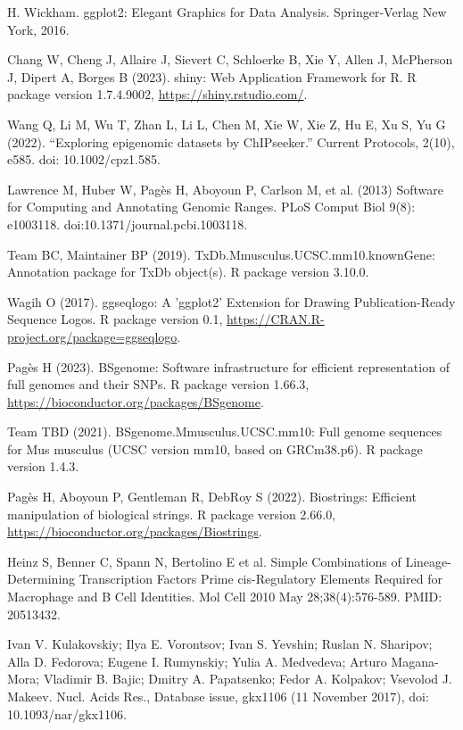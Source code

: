 \documentclass[12pt]{article}
\begin{document}
\begin{thebibliography}{99}
 H. Wickham. ggplot2: Elegant Graphics for Data Analysis.
Springer-Verlag New York, 2016.

 Chang W, Cheng J, Allaire J, Sievert C, Schloerke B, Xie Y,
Allen J, McPherson J, Dipert A, Borges B (2023). shiny: Web Application
Framework for R. R package version 1.7.4.9002, \url{https://shiny.rstudio.com/}.

 Wang Q, Li M, Wu T, Zhan L, Li L, Chen M, Xie W, Xie Z,
Hu E, Xu S, Yu G (2022). “Exploring epigenomic datasets by ChIPseeker.”
Current Protocols, 2(10), e585. doi: 10.1002/cpz1.585.

 Lawrence M, Huber W, Pag\`es H, Aboyoun P, Carlson M,
et al. (2013) Software for Computing and Annotating Genomic Ranges. PLoS Comput
Biol 9(8): e1003118. doi:10.1371/journal.pcbi.1003118.

 Team BC, Maintainer BP (2019). 
TxDb.Mmusculus.UCSC.mm10.knownGene: Annotation package for TxDb object(s).
R package version 3.10.0.

 Wagih O (2017). ggseqlogo: A 'ggplot2' Extension for
Drawing Publication-Ready Sequence Logos. R package version 0.1, \newline
\url{https://CRAN.R-project.org/package=ggseqlogo}.

 Pagès H (2023). BSgenome: Software infrastructure for
efficient representation of full genomes and their SNPs. R package version
1.66.3, \newline
\url{https://bioconductor.org/packages/BSgenome}.

 Team TBD (2021). BSgenome.Mmusculus.UCSC.mm10: Full
genome sequences for Mus musculus (UCSC version mm10, based on GRCm38.p6). R
package version 1.4.3.

 Pagès H, Aboyoun P, Gentleman R, DebRoy S (2022).
Biostrings: Efficient manipulation of biological strings. R package version
2.66.0, \newline
\url{https://bioconductor.org/packages/Biostrings}.

 Heinz S, Benner C, Spann N, Bertolino E et al. Simple
Combinations of Lineage-Determining Transcription Factors Prime cis-Regulatory
Elements Required for Macrophage and B Cell Identities. Mol Cell 2010 May
28;38(4):576-589. PMID: 20513432.

 Ivan V. Kulakovskiy; Ilya E. Vorontsov; Ivan S. Yevshin;
Ruslan N. Sharipov; Alla D. Fedorova; Eugene I. Rumynskiy; Yulia A. Medvedeva;
Arturo Magana-Mora; Vladimir B. Bajic; Dmitry A. Papatsenko; Fedor A. Kolpakov;
Vsevolod J. Makeev. Nucl. Acids Res., Database issue, gkx1106
(11 November 2017), doi: 10.1093/nar/gkx1106.

\end{thebibliography}
\newpage
\end{document}
